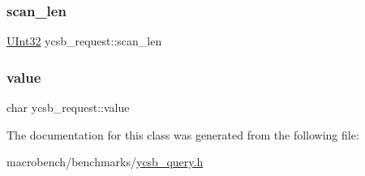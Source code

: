 \mbox{\label{classycsb__request_a6f0822555a46b0125a321043c871f619}} 
\subsubsection{\texorpdfstring{scan\+\_\+len}{scan\_len}}
{\footnotesize\ttfamily \hyperlink{global_8h_a7e8aeec7b6541935dfc6f608cd5170ce}{U\+Int32} ycsb\+\_\+request\+::scan\+\_\+len}

\mbox{\label{classycsb__request_a57822b9157083b797236b474f795ca36}} 
\subsubsection{\texorpdfstring{value}{value}}
{\footnotesize\ttfamily char ycsb\+\_\+request\+::value}



The documentation for this class was generated from the following file\+:\begin{DoxyCompactItemize}
\item 
macrobench/benchmarks/\hyperlink{ycsb__query_8h}{ycsb\+\_\+query.\+h}\end{DoxyCompactItemize}
